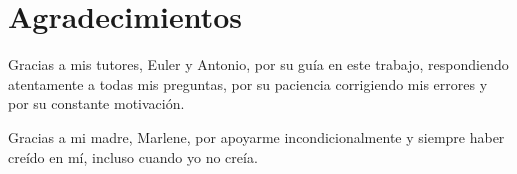 \chapter*{Agradecimientos}

\par Gracias a mis tutores, Euler y Antonio, por su guía en este trabajo, respondiendo atentamente a todas mis preguntas, por su paciencia corrigiendo mis errores y por su constante motivación.
\vspace{15pt}
\par Gracias a mi madre, Marlene, por apoyarme incondicionalmente y siempre haber creído en mí, incluso cuando yo no creía.